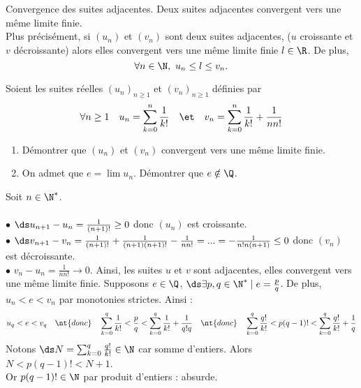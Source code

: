 \documentclass[11pt]{article}
\begin{document}
\begin{thm}{Convergence des suites adjacentes.}{}
    Deux suites adjacentes convergent vers une même limite finie.\\
    Plus précisément, si $(u_n)$ et $(v_n)$ sont deux suites adjacentes, ($u$ croissante et $v$ décroissante) alors elles convergent vers une même limite finie $l\in\R$. De plus,
    \begin{equation*}
        \forall n \in \N, ~ u_n \leq l \leq v_n.
    \end{equation*}
\end{thm}

\begin{ex}{}{}
    Soient les suites réelles $(u_n)_{n\geq1}$ et $(v_n)_{n\geq1}$ définies par
    \begin{equation*}
        \forall n \geq 1 \quad u_n = \sum_{k=0}^n\frac{1}{k!} \quad\et\quad v_n = \sum_{k=0}^n\frac{1}{k!} + \frac{1}{nn!}
    \end{equation*}
    \begin{enumerate}
        \item Démontrer que $(u_n)$ et $(v_n)$ convergent vers une même limite finie.
        \item On admet que $e=\lim u_n$. Démontrer que $e\notin\Q$.
    \end{enumerate}
    \tcblower
    Soit $n\in\N^*$.\\
    \\
    $\bullet$ $\ds u_{n+1} - u_n = \frac{1}{(n+1)!}\geq0$ donc $(u_n)$ est croissante.\\
    $\bullet$ $\ds v_{n+1}-v_n = \frac{1}{(n+1)!} + \frac{1}{(n+1)(n+1)!} - \frac{1}{nn!}=...=-\frac{1}{n!n(n+1)}\leq0$ donc $(v_n)$ est décroissante.\\
    $\bullet$ $v_n - u_n = \frac{1}{nn!}\to0$. Ainsi, les suites $u$ et $v$ sont adjacentes, elles convergent vers une même limite finie.\n
     Supposons $e\in\Q$, $\ds \exists p,q\in\N^*\mid e=\frac{p}{q}$. De plus, $u_n < e < v_n$ par monotonies strictes. Ainsi :
    \begin{equation*}
        u_q < e < v_q \quad\nt{donc}\quad \sum_{k=0}^q\frac{1}{k!}<\frac{p}{q}<\sum_{k=0}^q\frac{1}{k!}+\frac{1}{q!q} \quad\nt{donc}\quad \sum_{k=0}^q\frac{q!}{k!}<p(q-1)!<\sum_{k=0}^q\frac{q!}{k!}+\frac{1}{q}
    \end{equation*}
    Notons $\ds N=\sum_{k=0}^q\frac{q!}{k!}\in\N$ car somme d'entiers. Alors $N<p(q-1)!<N+1$.\\
    Or $p(q-1)!\in\N$ par produit d'entiers : absurde.
\end{ex}
\end{document}
